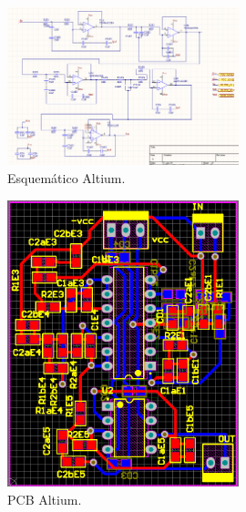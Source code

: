  \begin{figure}[H]
	\centering
	\includegraphics[width=0.6\textwidth]{ImagenesEjercicio2/altiumesq.PNG}
\caption{Esquemático Altium.}
	\label{fig:altiumesq}
\end{figure}
 \begin{figure}[H]
	\centering
	\includegraphics[width=0.6\textwidth]{ImagenesEjercicio2/altiumpcb.PNG}
\caption{PCB Altium.}
	\label{fig:altiumpcb}
\end{figure}

